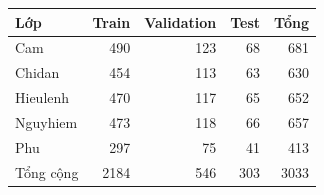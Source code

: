 \begin{tabular}{lrrrr}
\toprule
Lớp & Train & Validation & Test & Tổng \\
\midrule
Cam & 490 & 123 & 68 & 681 \\
Chidan & 454 & 113 & 63 & 630 \\
Hieulenh & 470 & 117 & 65 & 652 \\
Nguyhiem & 473 & 118 & 66 & 657 \\
Phu & 297 & 75 & 41 & 413 \\
Tổng cộng & 2184 & 546 & 303 & 3033 \\
\bottomrule
\end{tabular}
